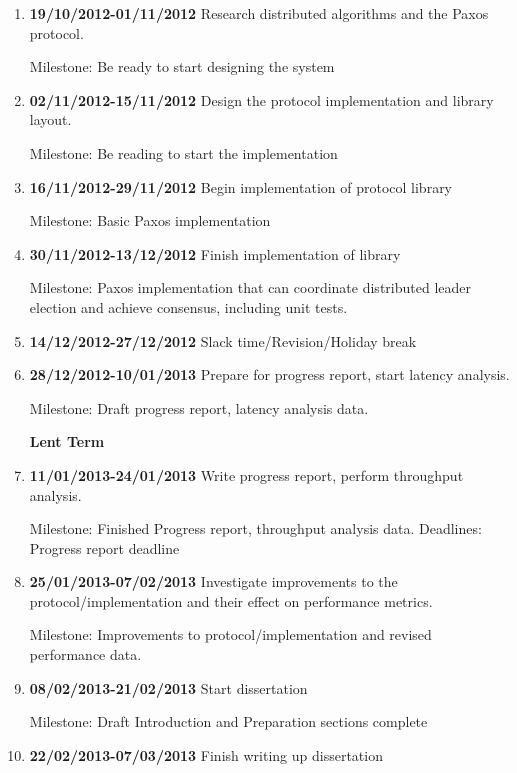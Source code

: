\begin{enumerate}

\item {\bf 19/10/2012-01/11/2012} Research distributed algorithms and the Paxos protocol.

Milestone: Be ready to start designing the system

\item {\bf 02/11/2012-15/11/2012} Design the protocol implementation and library layout.

Milestone: Be reading to start the implementation

\item {\bf 16/11/2012-29/11/2012} Begin implementation of protocol library

Milestone: Basic Paxos implementation


\item {\bf 30/11/2012-13/12/2012} Finish implementation of library

Milestone: Paxos implementation that can coordinate distributed leader election and achieve
consensus, including unit tests.

\item {\bf 14/12/2012-27/12/2012} Slack time/Revision/Holiday break

\item {\bf 28/12/2012-10/01/2013} Prepare for progress report, start latency analysis.

Milestone: Draft progress report, latency analysis data.

{\bf Lent Term}
\item {\bf 11/01/2013-24/01/2013} Write progress report, perform throughput analysis.

Milestone: Finished Progress report, throughput analysis data.
Deadlines: Progress report deadline

\item {\bf 25/01/2013-07/02/2013} Investigate improvements to the protocol/implementation and their effect on
performance metrics.

Milestone: Improvements to protocol/implementation and revised performance data.

\item {\bf 08/02/2013-21/02/2013} Start dissertation

Milestone: Draft Introduction and Preparation sections complete

\item {\bf 22/02/2013-07/03/2013} Finish writing up dissertation


\end{enumerate}
